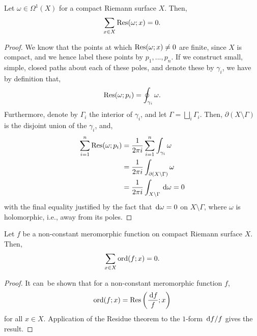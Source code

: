 \begin{theorem}
	Let $ \omega \in \Omega^1(X) $ for a compact Riemann surface $ X $. Then,
	\begin{align*}
		\sum_{x \in X}{\operatorname{Res}(\omega;x)}=0.
	\end{align*}
	\begin{proof}
		We know that the points at which $ \operatorname{Res}(\omega;x) \neq 0 $ are finite, since
		$ X $ is compact, and we hence label these points by $ p_1,...,p_n $. If we
		construct small, simple, closed paths about each of these poles, and denote
		these by $ \gamma_i $, we have by definition that,
		\begin{align*}
			\operatorname{Res}(\omega;p_i) = \oint_{\gamma_i}{\omega}.
		\end{align*}
		Furthermore, denote by $ \Gamma_i $ the interior of $ \gamma_i $, and let $
			\Gamma = \bigsqcup_i \Gamma_i$. Then, $ \partial (X \setminus \Gamma) $ is
		the disjoint union of the $ \gamma_i $, and,
		\begin{align*}
			\sum_{i=1}^{n}{\operatorname{Res}(\omega;p_i)} & =
			\frac{1}{2 \pi i}\sum_{i=1}^{n}{\int_{\gamma_i}{\omega}}                          \\
			                                 & = \frac{1}{2 \pi i}\int_{\partial (X \setminus
			\Gamma)}{\omega}                                                                  \\
			                                 & = \frac{1}{2 \pi i}\int_{X \setminus
				\Gamma}{\operatorname{\, d\!}{\omega}} = 0
		\end{align*}
		with the final equality justified by the fact that $ \operatorname{\, d\!}{\omega}=0 $ on $ X
			\setminus \Gamma $, where $ \omega $ is holomorphic, i.e., away from its
		poles.
	\end{proof}
\end{theorem}

\begin{corollary}
	Let $ f $ be a non-constant meromorphic function on compact Riemann surface $
		X$. Then,
	\begin{align*}
		\sum_{x \in X}{\operatorname{ord}(f;x)}=0.
	\end{align*}
	\begin{proof}
		It can\sidenotemark\ be shown that for a non-constant meromorphic function
		$ f $,
		\begin{align*}
			\operatorname{ord}(f;x) = \operatorname{Res} \left( \frac{\operatorname{\, d\!}{f}}{f};x \right)
		\end{align*}
		for all $ x \in X $. Application of the Residue theorem to the $ 1 $-form $
			\operatorname{\, d\!}{f}/f $ gives the result.
	\end{proof}
\end{corollary}

